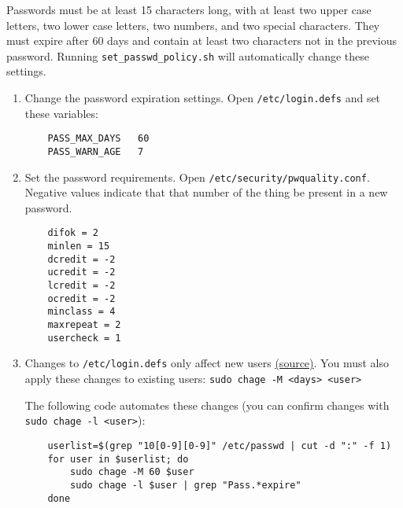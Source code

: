 Passwords must be at least 15 characters long, with at least two upper case letters, two lower case letters, two numbers, and two special characters. They must expire after 60 days and contain at least two characters not in the previous password. Running \texttt{set\_passwd\_policy.sh} will automatically change these settings.

\begin{enumerate}
\item Change the password expiration settings. Open \texttt{/etc/login.defs} and set these variables:

	\begin{verbatim}
	PASS_MAX_DAYS   60
	PASS_WARN_AGE   7
	\end{verbatim}

\item Set the password requirements. Open \texttt{/etc/security/pwquality.conf}. Negative values indicate that that number of the thing be present in a new password.

	\begin{verbatim}
	difok = 2
	minlen = 15
	dcredit = -2
	ucredit = -2
	lcredit = -2
	ocredit = -2
	minclass = 4
	maxrepeat = 2
	usercheck = 1
	\end{verbatim}

\item Changes to \texttt{/etc/login.defs} only affect new users \href{https://www.server-world.info/en/note?os=Ubuntu_16.04&p=password}{(source)}. You must also apply these changes to existing users: \texttt{sudo chage -M <days> <user>}

	The following code automates these changes (you can confirm changes with \texttt{sudo chage -l <user>}):

	\begin{verbatim}
	userlist=$(grep "10[0-9][0-9]" /etc/passwd | cut -d ":" -f 1)
	for user in $userlist; do
	    sudo chage -M 60 $user
	    sudo chage -l $user | grep "Pass.*expire"
	done
	\end{verbatim}

\end{enumerate}
